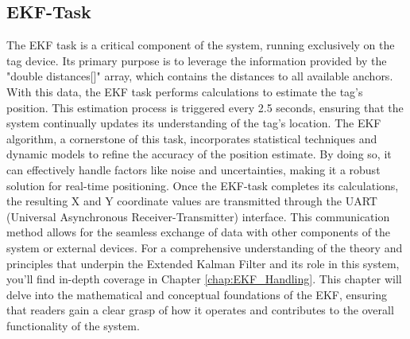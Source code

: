 \subsection{EKF-Task}
The EKF task is a critical component of the system, running exclusively on the tag device. 
Its primary purpose is to leverage the information provided by the "double distances[]" array, which contains the distances to all available anchors. 
With this data, the EKF task performs calculations to estimate the tag's position. 
This estimation process is triggered every 2.5 seconds, ensuring that the system continually updates its understanding of the tag's location.
\vspace{4pt}
\newline
The EKF algorithm, a cornerstone of this task, incorporates statistical techniques and dynamic models to refine the accuracy of the position estimate. 
By doing so, it can effectively handle factors like noise and uncertainties, making it a robust solution for real-time positioning.
\vspace{4pt}
\newline
Once the EKF-task completes its calculations, the resulting X and Y coordinate values are transmitted through the UART (Universal Asynchronous Receiver-Transmitter) interface. 
This communication method allows for the seamless exchange of data with other components of the system or external devices. 
\vspace{4pt}
\newline
For a comprehensive understanding of the theory and principles that underpin the Extended Kalman Filter and its role in this system, you'll find in-depth coverage in Chapter \ref{chap:EKF_Handling}. 
This chapter will delve into the mathematical and conceptual foundations of the EKF, ensuring that readers gain a clear grasp of how it operates and contributes to the overall functionality of the system.

